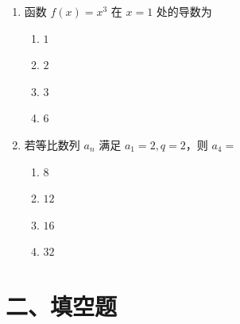\documentclass[UTF8,a4paper]{ctexart}
\begin{document}
\begin{enumerate}[leftmargin=2em,itemsep=0.8em]
\begin{enumerate}[label=\Alph*.,itemsep=0.2em,parsep=0pt]
\item $0$

\item $1$

\item $a$

\item $-1$

\end{enumerate}




\item 函数 $f(x)=x^3$ 在 $x=1$ 处的导数为

\begin{enumerate}[label=\Alph*.,itemsep=0.2em,parsep=0pt]

\item $1$

\item $2$

\item $3$

\item $6$

\end{enumerate}




\item 若等比数列 $a_n$ 满足 $a_1=2,q=2$，则 $a_4=$

\begin{enumerate}[label=\Alph*.,itemsep=0.2em,parsep=0pt]

\item $8$

\item $12$

\item $16$

\item $32$

\end{enumerate}



\end{enumerate}
\vspace{1em}


\section*{二、填空题}
\end{document}
